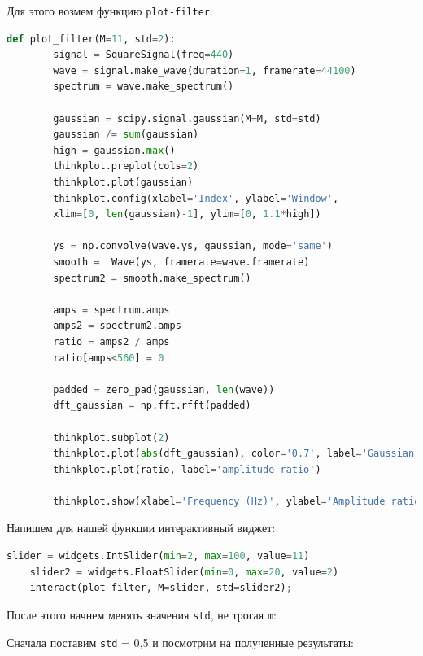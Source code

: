 \documentclass[a4paper]{article}
\begin{document}
            Для этого возмем функцию \texttt{plot-filter}:
            
\begin{lstlisting}[language=Python, caption= Функция \texttt{plot-filter}]
    def plot_filter(M=11, std=2):
        signal = SquareSignal(freq=440)
        wave = signal.make_wave(duration=1, framerate=44100)
        spectrum = wave.make_spectrum()
    
        gaussian = scipy.signal.gaussian(M=M, std=std)
        gaussian /= sum(gaussian)
        high = gaussian.max()
        thinkplot.preplot(cols=2)
        thinkplot.plot(gaussian)
        thinkplot.config(xlabel='Index', ylabel='Window',
        xlim=[0, len(gaussian)-1], ylim=[0, 1.1*high])
    
        ys = np.convolve(wave.ys, gaussian, mode='same')
        smooth =  Wave(ys, framerate=wave.framerate)
        spectrum2 = smooth.make_spectrum()
        
        amps = spectrum.amps
        amps2 = spectrum2.amps
        ratio = amps2 / amps    
        ratio[amps<560] = 0
    
        padded = zero_pad(gaussian, len(wave))
        dft_gaussian = np.fft.rfft(padded)
    
        thinkplot.subplot(2)
        thinkplot.plot(abs(dft_gaussian), color='0.7', label='Gaussian filter')
        thinkplot.plot(ratio, label='amplitude ratio')
        
        thinkplot.show(xlabel='Frequency (Hz)', ylabel='Amplitude ratio')
\end{lstlisting}
            
            Напишем для нашей функции интерактивный виджет:
            
\begin{lstlisting}[language=Python, caption= Интерактивный виджет для функции \texttt{plot-filter}]
    slider = widgets.IntSlider(min=2, max=100, value=11)
    slider2 = widgets.FloatSlider(min=0, max=20, value=2)
    interact(plot_filter, M=slider, std=slider2);
\end{lstlisting}
            
            После этого начнем менять значения \texttt{std}, не трогая \texttt{m}:
            
            Сначала поставим \texttt{std} = 0,5 и посмотрим на полученные результаты:
            
\end{document}

